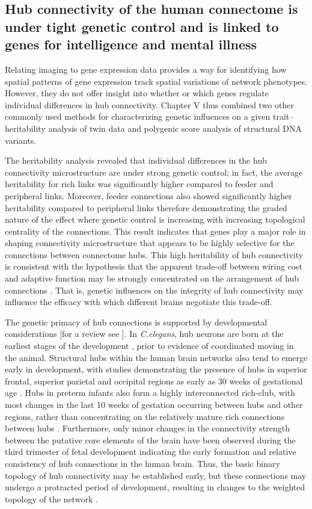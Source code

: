 \subsection*{Hub connectivity of the human connectome is under tight genetic control and is linked to genes for intelligence and mental illness}

Relating imaging to gene expression data provides a way for identifying how spatial patterns of gene expression track spatial variations of network phenotypes. However, they do not offer insight into whether or which genes regulate individual differences in hub connectivity. Chapter V thus combined two other commonly used methods for characterizing genetic influences on a given trait--heritability analysis of twin data and polygenic score analysis of structural DNA variants.

The heritability analysis revealed that individual differences in the hub connectivity microstructure are under strong genetic control; in fact, the average heritability for rich links was significantly higher compared to feeder and peripheral links. Moreover, feeder connections also showed significantly higher heritability compared to peripheral links therefore demonstrating the graded nature of the effect where genetic control is increasing with increasing topological centrality of the connections. This result indicates that genes play a major role in shaping connectivity microstructure that appears to be highly selective for the connections between connectome hubs. This high heritability of hub connectivity is consistent with the hypothesis that the apparent trade-off between wiring cost and adaptive function may be strongly concentrated on the arrangement of hub connections \citep{Bullmore2012}. That is, genetic influences on the integrity of hub connectivity may influence the efficacy with which different brains negotiate this trade-off.

The genetic primacy of hub connections is supported by developmental considerations [for a review see \citep{Oldham2018}]. In \textit{C.elegans}, hub neurons are born at the earliest stages of the development \citep{Varier2011}, prior to evidence of coordinated moving in the animal. Structural hubs within the human brain networks also tend to emerge early in development, with studies demonstrating the presence of hubs in superior frontal, superior parietal and occipital regions as early as 30 weeks of gestational age \citep{Ball2014}. Hubs in preterm infants also form a highly interconnected rich-club, with most changes in the last 10 weeks of gestation occurring between hubs and other regions, rather than concentrating on the relatively mature rich connections between hubs \citep{Ball2014}. Furthermore, only minor changes in the connectivity strength between the putative core elements of the brain have been observed during the third trimester of fetal development \citep{Batalle2017} indicating the early formation and relative consistency of hub connections in the human brain. Thus, the basic binary topology of hub connectivity may be established early, but these connections may undergo a protracted period of development, resulting in changes to the weighted topology of the network \citep{Baker2015a,Oldham2018}.

